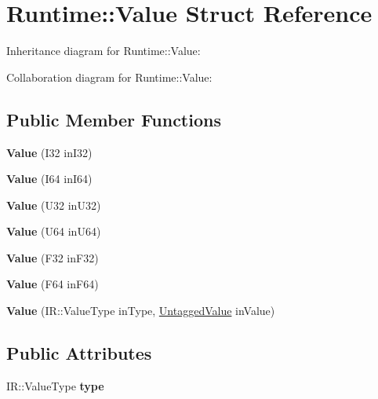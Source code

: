 \hypertarget{struct_runtime_1_1_value}{}\section{Runtime\+:\+:Value Struct Reference}
\label{struct_runtime_1_1_value}


Inheritance diagram for Runtime\+:\+:Value\+:


Collaboration diagram for Runtime\+:\+:Value\+:
\subsection*{Public Member Functions}
\begin{DoxyCompactItemize}
\item 
\mbox{\label{struct_runtime_1_1_value_a1dfedf42ed1498b99a5b43607d02d777}} 
{\bfseries Value} (I32 in\+I32)
\item 
\mbox{\label{struct_runtime_1_1_value_ad947c154244b0000a68e2f39a3a3ca0c}} 
{\bfseries Value} (I64 in\+I64)
\item 
\mbox{\label{struct_runtime_1_1_value_a7608d6b3704fb5363637050fd6aecbc5}} 
{\bfseries Value} (U32 in\+U32)
\item 
\mbox{\label{struct_runtime_1_1_value_a4142a2fda9548831239601c90bd36c04}} 
{\bfseries Value} (U64 in\+U64)
\item 
\mbox{\label{struct_runtime_1_1_value_acf92e4626319e046d89c1d77f64cecbf}} 
{\bfseries Value} (F32 in\+F32)
\item 
\mbox{\label{struct_runtime_1_1_value_a3199b53bb2b11663787ea261dd070573}} 
{\bfseries Value} (F64 in\+F64)
\item 
\mbox{\label{struct_runtime_1_1_value_a97c3c0b61b18a0a7a7ee5838f0357bbc}} 
{\bfseries Value} (I\+R\+::\+Value\+Type in\+Type, \mbox{\hyperlink{struct_runtime_1_1_untagged_value}{Untagged\+Value}} in\+Value)
\end{DoxyCompactItemize}
\subsection*{Public Attributes}
\begin{DoxyCompactItemize}
\item 
\mbox{\label{struct_runtime_1_1_value_ab9f389fb69e91866615d155dd859790e}} 
I\+R\+::\+Value\+Type {\bfseries type}
\end{DoxyCompactItemize}
